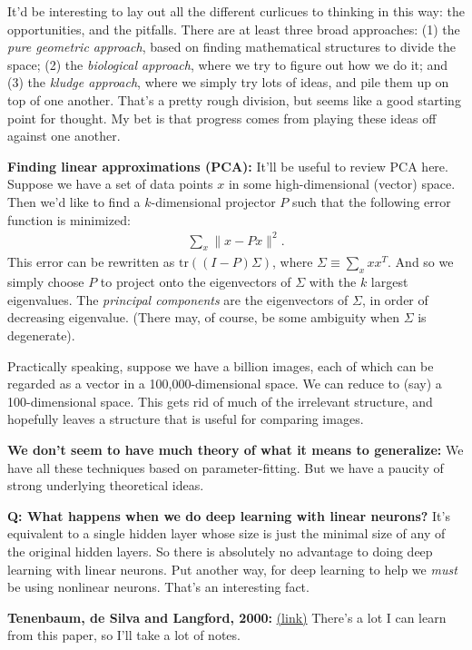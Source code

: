 \documentclass[12pt]{article}
\newcommand{\link}[2]{\href{#1}{#2}}
\begin{document}
It'd be interesting to lay out all the different curlicues to thinking
in this way: the opportunities, and the pitfalls.  There are at least
three broad approaches: (1) the \emph{pure geometric approach}, based
on finding mathematical structures to divide the space; (2) the
\emph{biological approach}, where we try to figure out how we do it;
and (3) the \emph{kludge approach}, where we simply try lots of ideas,
and pile them up on top of one another.  That's a pretty rough
division, but seems like a good starting point for thought.  My bet is
that progress comes from playing these ideas off against one another.

\textbf{Finding linear approximations (PCA):} It'll be useful to
review PCA here.  Suppose we have a set of data points $x$ in some
high-dimensional (vector) space.  Then we'd like to find a
$k$-dimensional projector $P$ such that the following error function
is minimized:
\begin{eqnarray}
\sum_x \| x-Px \|^2.
\end{eqnarray}
This error can be rewritten as $\mbox{tr}((I-P)\Sigma)$, where $\Sigma
\equiv \sum_x x x^T$.  And so we simply choose $P$ to project onto the
eigenvectors of $\Sigma$ with the $k$ largest eigenvalues.  The
\emph{principal components} are the eigenvectors of $\Sigma$, in order
of decreasing eigenvalue.  (There may, of course, be some ambiguity
when $\Sigma$ is degenerate).

Practically speaking, suppose we have a billion images, each of which
can be regarded as a vector in a 100,000-dimensional space.  We can
reduce to (say) a 100-dimensional space.  This gets rid of much of the
irrelevant structure, and hopefully leaves a structure that is useful
for comparing images.

\textbf{We don't seem to have much theory of what it means to
  generalize:} We have all these techniques based on
parameter-fitting.  But we have a paucity of strong underlying
theoretical ideas.

\textbf{Q: What happens when we do deep learning with linear neurons?}
It's equivalent to a single hidden layer whose size is just the
minimal size of any of the original hidden layers.  So there is
absolutely no advantage to doing deep learning with linear neurons.
Put another way, for deep learning to help we \emph{must} be using
nonlinear neurons.  That's an interesting fact.

\textbf{Tenenbaum, de Silva and Langford, 2000:}
\link{http://scholar.google.ca/scholar?cluster=14602426245887619907&hl=en&as_sdt=0,5}{(link)}
There's a lot I can learn from this paper, so I'll take a lot of
notes.
\end{document}

